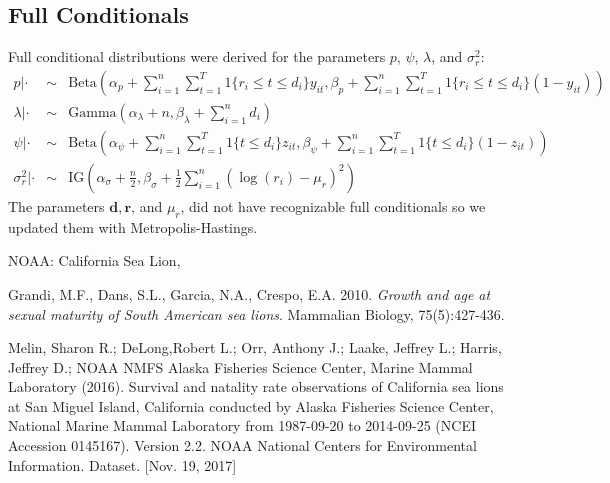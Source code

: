 \documentclass[12pt, a4paper]{article}
\begin{document}
\subsection{Full Conditionals} 

Full conditional distributions were derived for the parameters $p$, $\psi$, $\lambda$, and $\sigma_r^2$:
\begin{eqnarray*}
p | \cdot & \sim & \text{Beta} \left( \alpha_p + \sum_{i=1}^n \sum_{t=1}^T 1 \{ r_i \leq t \leq d_i \} y_{it}, \beta_p + \sum_{i=1}^n \sum_{t=1}^T 1\{ r_i \leq t \leq d_i \} (1 - y_{it}) \right)  \\
\lambda | \cdot & \sim & \text{Gamma} \left( \alpha_{\lambda} + n, \beta_{\lambda} + \sum_{i=1}^n d_i \right) \\
\psi | \cdot & \sim & \text{Beta}\left( \alpha_{\psi} + \sum_{i=1}^n \sum_{t=1}^T 1\{ t \leq d_i\} z_{it}, \beta_{\psi} + \sum_{i=1}^n \sum_{t=1}^T 1\{ t \leq d_i \} (1 - z_{it}) \right) \\
\sigma_{r}^2 | \cdot & \sim & \text{IG} \left( \alpha_{\sigma} + \frac{n}{2}, \beta_{\sigma} + \frac{1}{2} \sum_{i=1}^n ( \log(r_i) - \mu_r)^2 \right)
\end{eqnarray*}
The parameters $\mathbf{d}, \mathbf{r}$, and $\mu_r$, did not have recognizable full conditionals so we updated them with Metropolis-Hastings.  

\begin{thebibliography}{99}

NOAA: California Sea Lion, \\

Grandi, M.F., Dans, S.L., Garcia, N.A., Crespo, E.A. 2010. \emph{Growth and age at sexual maturity of South American sea lions}. Mammalian Biology, 75(5):427-436.   

Melin, Sharon R.; DeLong,Robert L.; Orr, Anthony J.; Laake, Jeffrey L.; Harris, Jeffrey D.; NOAA NMFS Alaska Fisheries Science Center, Marine Mammal Laboratory (2016). Survival and natality rate observations of California sea lions at San Miguel Island, California conducted by Alaska Fisheries Science Center, National Marine Mammal Laboratory from 1987-09-20 to 2014-09-25 (NCEI Accession 0145167). Version 2.2. NOAA National Centers for Environmental Information. Dataset. [Nov. 19, 2017]

\end{thebibliography}
\end{document}
